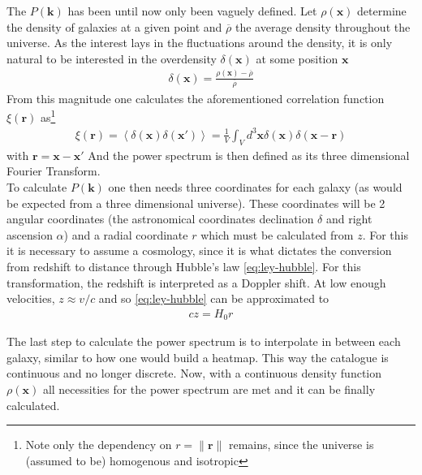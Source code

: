 The $P(\textbf{k})$ has been until now only been vaguely defined. Let  $\rho(\textbf{x})$ determine the density of galaxies at a given point and $ \overline{\rho}$ the average density throughout the universe. As the interest lays in the fluctuations around the density, it is only natural to be interested in the overdensity $\delta(\textbf{x})$ at some position $\textbf{x}$
\begin{align}
	\delta(\textbf{x}) = \frac{\rho\left( \textbf{x} \right) - \overline{\rho}}{\overline{\rho}}
	\label{eq:overdensity)}
\end{align}
From this magnitude one calculates the aforementioned correlation function $\xi(\textbf{r})$ as\footnote{Note only the dependency on $r = \|\textbf{r}\|$ remains, since the universe is (assumed to be) homogenous and isotropic}
\begin{align}
	\xi(\textbf{r}) = \left<\delta(\textbf{x}) \delta(\textbf{x}') \right> = \frac{1}{V}\int_{V}^{}  d^3 \textbf{x} \delta(\textbf{x}) \delta\left(\textbf{x} - \textbf{r}  \right) 
	\label{eq:correlation-function}
\end{align} with $\textbf{r} = \textbf{x} - \textbf{x}'$
And the power spectrum is then defined as its three dimensional Fourier Transform. \\

To calculate $P(\textbf{k})$ one then needs three coordinates for each galaxy (as would be expected from a three dimensional universe). These coordinates will be 2 angular coordinates (the astronomical coordinates declination $\delta$ and right ascension $\alpha$) and a radial coordinate $r$ which must be calculated from $z$. For this it is necessary to assume a cosmology, since it is what dictates the conversion from redshift to distance through Hubble's law \eqref{eq:ley-hubble}. For this transformation, the redshift is interpreted as a Doppler shift. At low enough velocities, $z\approx v /c$ and so \eqref{eq:ley-hubble} can be approximated to 
\begin{align}
c z = H_0 r	
\end{align}

The last step to calculate the power spectrum is to interpolate in between each galaxy, similar to how one would build a heatmap. This way the catalogue is continuous and no longer discrete. Now, with a continuous density function $\rho(\textbf{x})$ all necessities for the power spectrum are met and it can be finally calculated. \\

